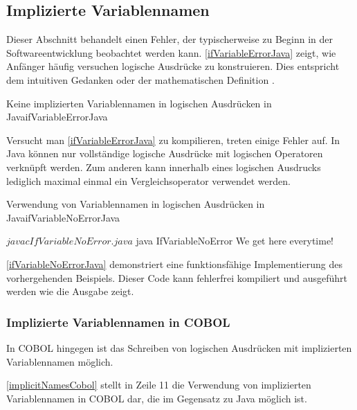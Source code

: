 \subsection{Implizierte Variablennamen}
Dieser Abschnitt behandelt einen Fehler, der typischerweise zu Beginn in der Softwareentwicklung beobachtet werden kann. \autoref{ifVariableErrorJava} zeigt, wie Anfänger häufig versuchen logische Ausdrücke zu konstruieren. Dies entspricht dem intuitiven Gedanken  oder der mathematischen Definition .

\begin{codeWithCaption}{Keine implizierten Variablennamen in logischen Ausdrücken in Java}{ifVariableErrorJava}
\begin{shellwindow}
$ javac -Xmaxerrs 3 IfVariableError.java 
IfVariableError.java:4: error: > expected
        if (System.currentTimeMillis() > 0 && < Long.MAX_VALUE) {
                                                              ^
IfVariableError.java:4: error: ')' expected
        if (System.currentTimeMillis() > 0 && < Long.MAX_VALUE) {
                                                               ^
IfVariableError.java:8: error: illegal start of type
        if (0 < System.currentTimeMillis() < Long.MAX_VALUE) {
        ^
3 errors
\end{shellwindow}
\end{codeWithCaption}

Versucht man \autoref{ifVariableErrorJava} zu kompilieren, treten einige Fehler auf. In Java können nur vollständige logische Ausdrücke mit logischen Operatoren verknüpft werden. Zum anderen kann innerhalb eines logischen Ausdrucks lediglich maximal einmal ein Vergleichsoperator verwendet werden. 

\begin{codeWithCaption}{Verwendung von Variablennamen in logischen Ausdrücken in Java}{ifVariableNoErrorJava}
\begin{shellwindow}
$ javac IfVariableNoError.java 
$ java IfVariableNoError
We get here everytime!
\end{shellwindow}
\end{codeWithCaption}

\autoref{ifVariableNoErrorJava} demonstriert eine funktionsfähige Implementierung des vorhergehenden Beispiels. Dieser Code kann fehlerfrei kompiliert und ausgeführt werden wie die Ausgabe zeigt.

\subsubsection*{Implizierte Variablennamen in COBOL}
In COBOL hingegen ist das Schreiben von logischen Ausdrücken mit implizierten Variablennamen möglich.


\autoref{implicitNamesCobol} stellt in Zeile 11 die Verwendung von implizierten Variablennamen in COBOL dar, die im Gegensatz zu Java möglich ist.